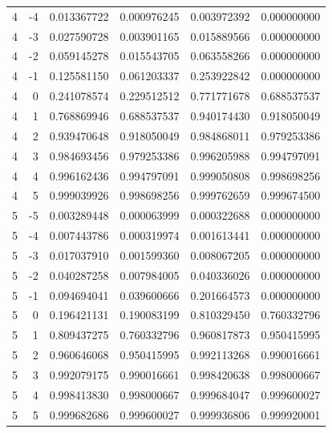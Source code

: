 \begin{tabular}{rrrrrr}
4 & -4 & 0.013367722 & 0.000976245 & 0.003972392 & 0.000000000 \\
4 & -3 & 0.027590728 & 0.003901165 & 0.015889566 & 0.000000000 \\
4 & -2 & 0.059145278 & 0.015543705 & 0.063558266 & 0.000000000 \\
4 & -1 & 0.125581150 & 0.061203337 & 0.253922842 & 0.000000000 \\
4 & 0 & 0.241078574 & 0.229512512 & 0.771771678 & 0.688537537 \\
4 & 1 & 0.768869946 & 0.688537537 & 0.940174430 & 0.918050049 \\
4 & 2 & 0.939470648 & 0.918050049 & 0.984868011 & 0.979253386 \\
4 & 3 & 0.984693456 & 0.979253386 & 0.996205988 & 0.994797091 \\
4 & 4 & 0.996162436 & 0.994797091 & 0.999050808 & 0.998698256 \\
4 & 5 & 0.999039926 & 0.998698256 & 0.999762659 & 0.999674500 \\
5 & -5 & 0.003289448 & 0.000063999 & 0.000322688 & 0.000000000 \\
5 & -4 & 0.007443786 & 0.000319974 & 0.001613441 & 0.000000000 \\
5 & -3 & 0.017037910 & 0.001599360 & 0.008067205 & 0.000000000 \\
5 & -2 & 0.040287258 & 0.007984005 & 0.040336026 & 0.000000000 \\
5 & -1 & 0.094694041 & 0.039600666 & 0.201664573 & 0.000000000 \\
5 & 0 & 0.196421131 & 0.190083199 & 0.810329450 & 0.760332796 \\
5 & 1 & 0.809437275 & 0.760332796 & 0.960817873 & 0.950415995 \\
5 & 2 & 0.960646068 & 0.950415995 & 0.992113268 & 0.990016661 \\
5 & 3 & 0.992079175 & 0.990016661 & 0.998420638 & 0.998000667 \\
5 & 4 & 0.998413830 & 0.998000667 & 0.999684047 & 0.999600027 \\
5 & 5 & 0.999682686 & 0.999600027 & 0.999936806 & 0.999920001 \\
\bottomrule
\end{tabular}
